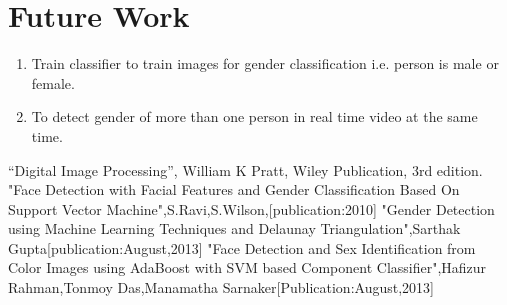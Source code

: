 \documentclass[journal]{IEEEtran}
\begin{document}
	
	
	
    \section{\textbf{Future Work}}
    \begin{enumerate}
        \item Train classifier to train images for gender classification i.e. person is male or female.
        \item To detect gender of more than one person in real time video at the same time.
        
       
    \end{enumerate}
	
	
	\begin{thebibliography}{1}
	“Digital Image Processing”, William K Pratt, Wiley
	Publication, 3rd edition.
	"Face Detection with Facial Features and Gender Classification Based On
	Support Vector Machine",S.Ravi,S.Wilson,[publication:2010]
	"Gender Detection using Machine Learning Techniques
	and Delaunay Triangulation",Sarthak Gupta[publication:August,2013]
	"Face Detection and Sex Identification from Color Images
	using AdaBoost with SVM based Component Classifier",Hafizur Rahman,Tonmoy Das,Manamatha Sarnaker[Publication:August,2013]
	
	\end{thebibliography}
	
	
	
\end{document}
